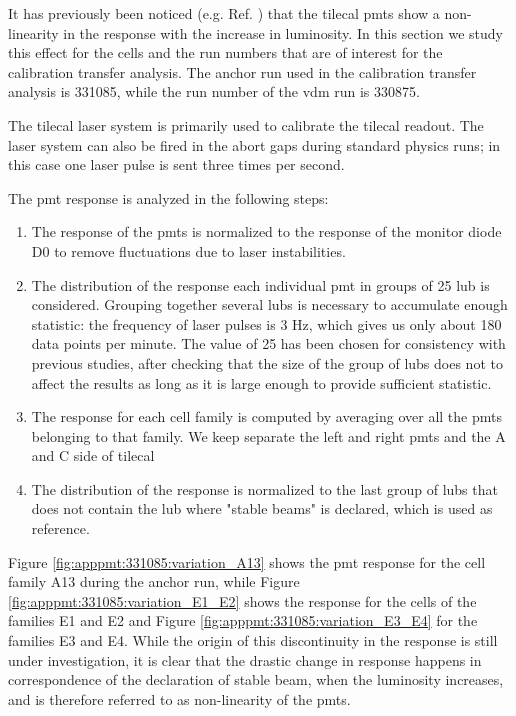 It has previously been noticed (e.g. Ref. \cite{giulia:tesi}) that the \gls{tilecal} \glspl{pmt} show a non-linearity in 
the response with the increase in luminosity. 
In this section we study this effect for the cells and the run numbers that are of interest for the 
calibration transfer analysis. 
The anchor run used in the calibration transfer analysis is 331085, while the run number of the \gls{vdm} 
run is 330875.

The \gls{tilecal} laser system is primarily used to calibrate the \gls{tilecal} readout. 
The laser system can also be fired in the abort gaps during standard physics runs; in this case 
one laser pulse is sent three times per second.



The \gls{pmt} response is analyzed in the following steps:
\begin{enumerate}
\item The response of the \glspl{pmt} is normalized to the response of the monitor diode D0 to remove fluctuations 
due to laser instabilities.

\item The distribution of the response each individual \gls{pmt} in groups of 25 \gls{lub} is considered. 
Grouping together several \glspl{lub} is necessary to accumulate enough statistic: the frequency of laser pulses is 3 Hz, 
which gives us only about 180 data points per minute. The value of 25 has been chosen for consistency with previous studies, 
after checking that the size of the group of \glspl{lub} does not to affect the results 
as long as it is large enough to provide sufficient statistic.

\item The response for each cell family is computed by averaging over all the \glspl{pmt} 
belonging to that family. We keep separate the left and right \glspl{pmt} and the A and C side 
of \gls{tilecal}

\item The distribution of the response is normalized to the last group of \glspl{lub} that 
does not contain the \gls{lub} where "stable beams" is declared, which is used as reference.

\end{enumerate} 

Figure \ref{fig:apppmt:331085:variation_A13} shows the \gls{pmt} response for the cell family A13 during the anchor run, 
while Figure \ref{fig:apppmt:331085:variation_E1_E2} shows the response for the cells of the families E1 and E2 
and Figure \ref{fig:apppmt:331085:variation_E3_E4} for the families E3 and E4.
While the origin of this discontinuity in the response is still under investigation, it is clear that 
the drastic change in response happens in correspondence of the declaration of stable beam, when the 
luminosity increases, and is therefore referred to as non-linearity of the \glspl{pmt}. 

